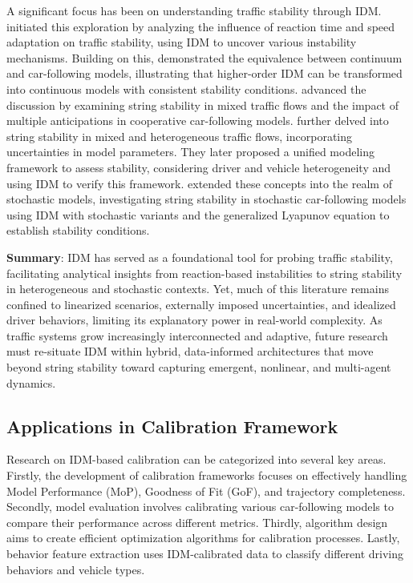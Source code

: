 \documentclass[a4paper,fleqn]{cas-sc}
\begin{document}
A significant focus has been on understanding traffic stability through IDM. \cite{kestingHowReactionTimeUpdate2008} initiated this exploration by analyzing the influence of reaction time and speed adaptation on traffic stability, using IDM to uncover various instability mechanisms. Building on this, \cite{jinEquivalenceContinuumCarFollowingModels2016a} demonstrated the equivalence between continuum and car-following models, illustrating that higher-order IDM can be transformed into continuous models with consistent stability conditions. \cite{monteil_linear_2014} advanced the discussion by examining string stability in mixed traffic flows and the impact of multiple anticipations in cooperative car-following models. \cite{montaninoHomogeneousHeterogeneousTrafficFlows2021b} further delved into string stability in mixed and heterogeneous traffic flows, incorporating uncertainties in model parameters. They later proposed a unified modeling framework \citep{montaninoStringStabilityMixedHeterogeneous2021b} to assess stability, considering driver and vehicle heterogeneity and using IDM to verify this framework. \cite{bouadiStochasticFactorsStringStability2022b} extended these concepts into the realm of stochastic models, investigating string stability in stochastic car-following models using IDM with stochastic variants and the generalized Lyapunov equation to establish stability conditions.

\textbf{Summary}: IDM has served as a foundational tool for probing traffic stability, facilitating analytical insights from reaction-based instabilities to string stability in heterogeneous and stochastic contexts. Yet, much of this literature remains confined to linearized scenarios, externally imposed uncertainties, and idealized driver behaviors, limiting its explanatory power in real-world complexity. As traffic systems grow increasingly interconnected and adaptive, future research must re-situate IDM within hybrid, data-informed architectures that move beyond string stability toward capturing emergent, nonlinear, and multi-agent dynamics.


\subsection{Applications in Calibration Framework}

Research on IDM-based calibration can be categorized into several key areas. Firstly, the development of calibration frameworks focuses on effectively handling Model Performance (MoP), Goodness of Fit (GoF), and trajectory completeness. Secondly, model evaluation involves calibrating various car-following models to compare their performance across different metrics. Thirdly, algorithm design aims to create efficient optimization algorithms for calibration processes. Lastly, behavior feature extraction uses IDM-calibrated data to classify different driving behaviors and vehicle types. 
\end{document}
